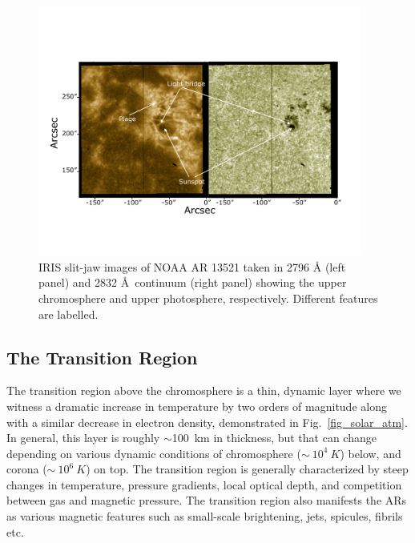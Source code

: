 \begin{figure}[ht!]
    \centering
    \includegraphics[trim={1cm 3cm 2cm 5cm},clip,width=0.95\textwidth]{Figures/sji_images.pdf}
    \caption[IRIS SJI observation of NOAA AR 13521 on Dec 21st, 2023.]{IRIS slit-jaw images of NOAA AR 13521 taken in  2796 {\AA} (left panel) and 2832 {\AA}~continuum (right panel) showing the upper chromosphere and upper photosphere, respectively. Different features are labelled.} 
    \label{fig:sji_features}
\end{figure}

\subsection{The Transition Region}\label{transition-region}

The transition region above the chromosphere is a thin, dynamic layer where we witness a dramatic increase in temperature by two orders of magnitude along with a similar decrease in electron density, demonstrated in Fig.~\ref{fig_solar_atm}. In general, this layer is roughly $\sim$100~km in thickness, but that can change depending on various dynamic conditions of chromosphere ($\sim~10^{4}~K$) below, and corona ($\sim~10^{6}~K$) on top. The transition region is generally characterized by steep changes in temperature, pressure gradients, local optical depth, and competition between gas and magnetic pressure. The transition region also manifests the ARs as various magnetic features such as small-scale brightening, jets, spicules, fibrils etc. 

